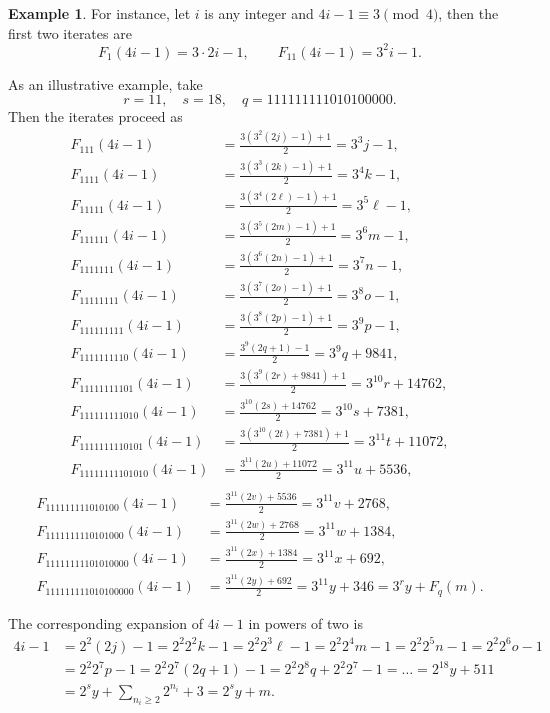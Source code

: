 \documentclass{amsart}
\theoremstyle{definition}
\newtheorem{example}[theorem]{Example}
\theoremstyle{remark}
\numberwithin{equation}{section}
\begin{document}
\begin{example}	
For instance, let $i$ is any integer and $4i-1 \equiv 3\pmod{4}$, then the first two iterates are
\[
F_{1}(4i-1) = 3\cdot 2i - 1, 
\qquad 
F_{11}(4i-1) = 3^2 i - 1.
\]

As an illustrative example, take 
\[
r = 11, \quad s = 18, \quad q = 111111111010100000.
\]
Then the iterates proceed as
\[
\begin{aligned}
	F_{111}(4i-1) &= \frac{3(3^2(2j)-1)+1}{2} = 3^3 j - 1,\\
	F_{1111}(4i-1) &= \frac{3(3^3(2k)-1)+1}{2} = 3^4 k - 1,\\
	F_{11111}(4i-1) &= \frac{3(3^4(2\ell)-1)+1}{2} = 3^5 \ell - 1,\\
	F_{111111}(4i-1) &= \frac{3(3^5(2m)-1)+1}{2} = 3^6 m - 1,\\
	F_{1111111}(4i-1) &= \frac{3(3^6(2n)-1)+1}{2} = 3^7 n - 1,\\
	F_{11111111}(4i-1) &= \frac{3(3^7(2o)-1)+1}{2} = 3^8 o - 1,\\
	F_{111111111}(4i-1) &= \frac{3(3^8(2p)-1)+1}{2} = 3^9 p - 1,\\
	F_{1111111110}(4i-1) &= \frac{3^9(2q+1)-1}{2} = 3^9 q + 9841,\\
	F_{11111111101}(4i-1) &= \frac{3(3^9(2r)+9841)+1}{2} = 3^{10} r + 14762,\\
	F_{111111111010}(4i-1) &= \frac{3^{10}(2s)+14762}{2} = 3^{10} s + 7381,\\
	F_{1111111110101}(4i-1) &= \frac{3(3^{10}(2t)+7381)+1}{2} = 3^{11} t + 11072,\\
	F_{11111111101010}(4i-1) &= \frac{3^{11}(2u)+11072}{2} = 3^{11} u + 5536,\\
\end{aligned}	
\]
\[
\begin{aligned}
	F_{111111111010100}(4i-1) &= \frac{3^{11}(2v)+5536}{2} = 3^{11} v + 2768,\\
	F_{1111111110101000}(4i-1) &= \frac{3^{11}(2w)+2768}{2} = 3^{11} w + 1384,\\
	F_{11111111101010000}(4i-1) &= \frac{3^{11}(2x)+1384}{2} = 3^{11} x + 692,\\
	F_{111111111010100000}(4i-1) &= \frac{3^{11}(2y)+692}{2} = 3^{11} y + 346 = 3^r y + F_q(m).
\end{aligned}
\]

The corresponding expansion of $4i-1$ in powers of two is
\[
\begin{aligned}
	4i-1 &= 2^2 (2j) - 1 = 2^2 2^2 k - 1 = 2^2 2^3 \ell - 1 = 2^2 2^4 m - 1 = 2^2 2^5 n - 1 = 2^2 2^6 o - 1\\
	&= 2^2 2^7 p - 1 = 2^2 2^7 (2q+1) - 1 = 2^2 2^8 q + 2^2 2^7 - 1 = \hdots = 2^{18} y + 511\\
	&= 2^s y + \sum_{n_i \ge 2} 2^{n_i} + 3 = 2^s y + m.\\
\end{aligned}
\]

\end{example}
\end{document}
